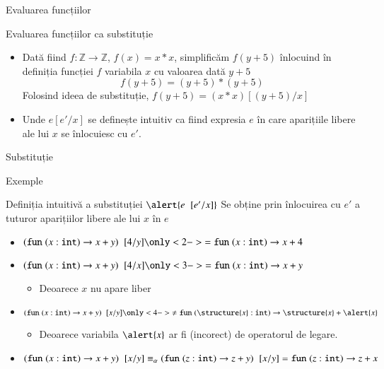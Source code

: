 \documentclass[xcolor=pdftex,romanian,colorlinks]{beamer}
\begin{document}
\begin{section}{Evaluarea funcțiilor}
\begin{frame}{Evaluarea funcțiilor ca substituție}
\begin{itemize}
\item Dată fiind $f : \mathbb{Z} \longrightarrow \mathbb{Z}$, $f(x) = x * x$, simplificăm  $f(y+5)$  înlocuind în definiția funcției $f$ variabila $x$ cu valoarea dată $y+5$
\[f(y + 5) = (y + 5) * (y + 5)\] 
\vitem Folosind ideea de substituție, $f(y + 5) = (x * x)[(y + 5) / x]$
\item Unde $e[e' / x]$ se definește \alert{intuitiv} ca fiind expresia $e$ în care aparițiile libere ale lui $x$ se înlocuiesc cu $e'$.
\end{itemize}
\end{frame}

\begin{subsection}{Substituție}
\begin{frame}{}{Exemple}
\begin{block}{Definiția intuitivă a substituției $\alert{\substapp{e}{\subst{\substpair{e'}{x}}}}$}
Se obține prin înlocuirea cu $e'$ a tuturor aparițiilor libere ale lui $x$ în $e$
\end{block}

\vfill
\begin{itemize}
\item $\substapp{(\Sfun (x:{\Sint})\rightarrow x + y)}{\subst{\substpair{4}{y}}}\only<2->{={\Sfun (x:{\Sint})\rightarrow x + 4}}$
\item<2-> $\substapp{(\Sfun (x:{\Sint})\rightarrow x + y)}{\subst{\substpair{4}{x}}}\only<3->{={\Sfun (x:{\Sint})\rightarrow x + y}}$
\begin{itemize}
\item<3-> Deoarece $x$ nu apare liber
\end{itemize}
\item<3-> $\substapp{(\Sfun (x:{\Sint})\rightarrow x + y)}{\subst{\substpair{x}{y}}}\only<4->{\not={\Sfun (\structure{x}:{\Sint})\rightarrow  \structure{x} + \alert{x}}}$
\begin{itemize}
\item<4-> Deoarece variabila $\alert{x}$ ar fi  (incorect) de operatorul de legare.
\end{itemize}
\item<5-> $(\mathrel{\text{\ttfamily fun}} (x:{\mathrel{\text{\ttfamily int}}})\rightarrow x + y)\mathrel{}[x/y] \equiv_\alpha (\mathrel{\text{\ttfamily fun}} (z:{\mathrel{\text{\ttfamily int}}})\rightarrow z + y)\mathrel{}[x/y] = {\mathrel{\text{\ttfamily fun}} (z:{\mathrel{\text{\ttfamily int}}})\rightarrow z + x}$
\end{itemize}
\end{frame}



\end{subsection}
\end{section}
\end{document}

